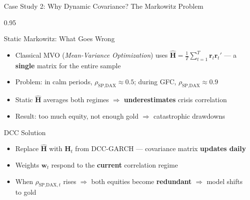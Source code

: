 \documentclass[9pt, aspectratio=169, t]{beamer}
\begin{document}
\begin{frame}{Case Study 2: Why Dynamic Covariance? The Markowitz Problem}
    \begin{cminipage}{0.95\textwidth}
    {\footnotesize
    \begin{block}{Static Markowitz: What Goes Wrong}
        \begin{itemize}\setlength{\itemsep}{1pt}
            \item Classical MVO (\textit{Mean-Variance Optimization}) uses $\hat{\mathbf{H}} = \frac{1}{T}\sum_{t=1}^{T}\mathbf{r}_t\mathbf{r}_t'$ --- a \textbf{single} matrix for the entire sample
            \item Problem: in calm periods, $\rho_{\text{SP,DAX}} \approx 0.5$; during GFC, $\rho_{\text{SP,DAX}} \approx 0.9$
            \item Static $\hat{\mathbf{H}}$ averages both regimes $\Rightarrow$ \textbf{underestimates} crisis correlation
            \item Result: too much equity, not enough gold $\Rightarrow$ catastrophic drawdowns
        \end{itemize}
    \end{block}
    \begin{block}{DCC Solution}
        \begin{itemize}\setlength{\itemsep}{0pt}
            \item Replace $\hat{\mathbf{H}}$ with $\mathbf{H}_t$ from DCC-GARCH --- covariance matrix \textbf{updates daily}
            \item Weights $\mathbf{w}_t$ respond to the \textbf{current} correlation regime
            \item When $\rho_{\text{SP,DAX},t}$ rises $\Rightarrow$ both equities become \textbf{redundant} $\Rightarrow$ model shifts to gold
        \end{itemize}
    \end{block}
    }
    \end{cminipage}
\end{frame}
\end{document}
